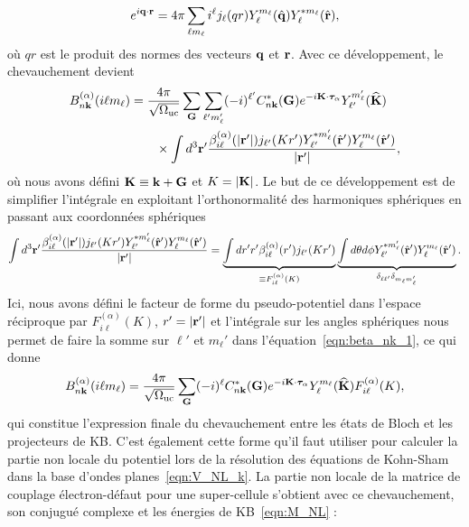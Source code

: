 \begin{equation}
    e^{i\mathbf{q}\cdot\mathbf{r}} = 4\pi \sum_{\ell m_\ell}i^\ell j_\ell (qr)Y_\ell^{m_\ell}(\hat{\mathbf{q}})Y_\ell^{*m_\ell}(\hat{\mathbf{r}}),
\end{equation}
où $qr$ est le produit des normes des vecteurs $\mathbf{q}$ et $\mathbf{r}$. Avec ce développement, le chevauchement devient
\begin{align}
    B_{n\mathbf{k}}^{(\alpha)}(i\ell m_\ell) &=\frac{4\pi}{\sqrt{\Omega_\text{uc}}}\sum_{\mathbf{G}}\sum_{\ell'm_\ell'}(-i)^{\ell'}C^*_{n\mathbf{k}}(\mathbf{G})e^{-i\mathbf{K}\cdot\bm{\tau}_\alpha}Y_{\ell'}^{m_\ell'}(\widehat{\mathbf{K}})\notag\\
    &\qquad\times\int d^3\mathbf{r}'\frac{\beta_{i\ell}^{(\alpha)}(|\mathbf{r}'|)j_{\ell'}(Kr')Y_{\ell'}^{*m_\ell'}(\hat{\mathbf{r}}')Y_{\ell}^{m_\ell}(\hat{\mathbf{r}}')}{|\mathbf{r}'|},\label{eqn:beta_nk_1}
\end{align}
où nous avons défini $\mathbf{K}\equiv\mathbf{k}+\mathbf{G}$ et $K=|\mathbf{K}|$. Le but de ce développement est de simplifier l'intégrale en exploitant l'orthonormalité des harmoniques sphériques en passant aux coordonnées sphériques
\begin{equation}
    \int d^3\mathbf{r}'\frac{\beta_{i\ell}^{(\alpha)}(|\mathbf{r}'|)j_{\ell'}(Kr')Y_{\ell'}^{*m_\ell'}(\hat{\mathbf{r}}')Y_{\ell}^{m_\ell}(\hat{\mathbf{r}}')}{|\mathbf{r}'|} = \underbrace{\int dr' r' \beta_{i\ell}^{(\alpha)}(r')j_{\ell'}(Kr')}_{\equiv F_{i\ell}^{(\alpha)}(K)}\underbrace{\int d\theta d\phi Y_{\ell'}^{*m_\ell'}(\hat{\mathbf{r}}')Y_\ell^{m_\ell}(\hat{\mathbf{r}}')}_{\delta_{\ell\ell'}\delta_{m_\ell m_\ell'}}.
\end{equation}
Ici, nous avons défini le facteur de forme du pseudo-potentiel dans l'espace réciproque par $F_{i\ell}^{(\alpha)}(K)$, $r'=|\mathbf{r}'|$ et l'intégrale sur les angles sphériques nous permet de faire la somme sur $\ell'$ et $m_\ell'$ dans l'équation~\eqref{eqn:beta_nk_1}, ce qui donne
\begin{equation}
    B_{n\mathbf{k}}^{(\alpha)}(i\ell m_\ell) =\frac{4\pi}{\sqrt{\Omega_\text{uc}}}\sum_{\mathbf{G}}(-i)^\ell C_{n\mathbf{k}}^*(\mathbf{G})e^{-i\mathbf{K}\cdot\bm{\tau}_\alpha}Y_\ell^{m_\ell}(\widehat{\mathbf{K}})F_{i\ell}^{(\alpha)}(K),
\end{equation}
qui constitue l'expression finale du chevauchement entre les états de Bloch et les projecteurs de KB. C'est également cette forme qu'il faut utiliser pour calculer la partie non locale du potentiel lors de la résolution des équations de Kohn-Sham dans la base d'ondes planes~\eqref{eqn:V_NL_k}. La partie non locale de la matrice de couplage électron-défaut pour une super-cellule s'obtient avec ce chevauchement, son conjugué complexe et les énergies de KB~\eqref{eqn:M_NL} :
